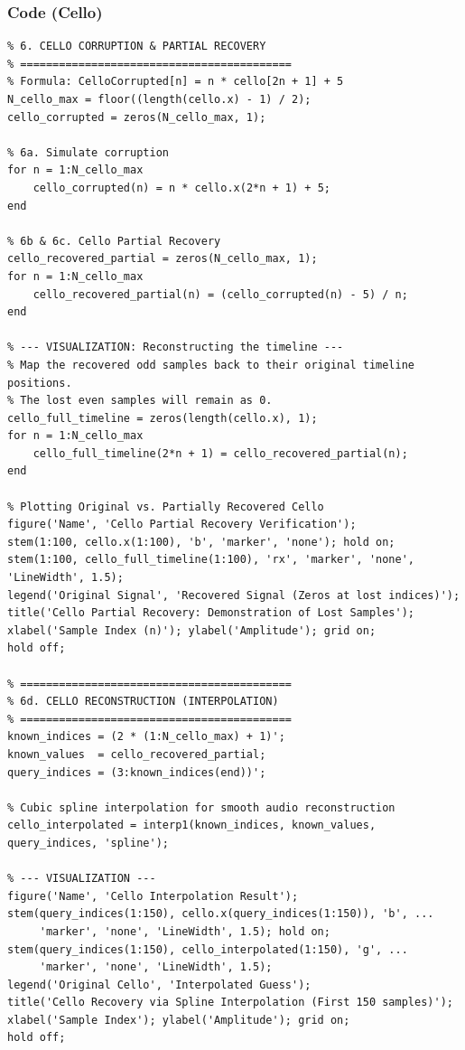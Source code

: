 \documentclass[12pt, a4paper]{article}
\begin{document}
\subsubsection{Code (Cello)}
\begin{lstlisting}[style=matlabstyle]
% ==========================================
% 6. CELLO CORRUPTION & PARTIAL RECOVERY
% ==========================================
% Formula: CelloCorrupted[n] = n * cello[2n + 1] + 5
N_cello_max = floor((length(cello.x) - 1) / 2);
cello_corrupted = zeros(N_cello_max, 1);

% 6a. Simulate corruption
for n = 1:N_cello_max
    cello_corrupted(n) = n * cello.x(2*n + 1) + 5;
end

% 6b & 6c. Cello Partial Recovery
cello_recovered_partial = zeros(N_cello_max, 1);
for n = 1:N_cello_max
    cello_recovered_partial(n) = (cello_corrupted(n) - 5) / n;
end

% --- VISUALIZATION: Reconstructing the timeline ---
% Map the recovered odd samples back to their original timeline positions.
% The lost even samples will remain as 0.
cello_full_timeline = zeros(length(cello.x), 1);
for n = 1:N_cello_max
    cello_full_timeline(2*n + 1) = cello_recovered_partial(n);
end

% Plotting Original vs. Partially Recovered Cello
figure('Name', 'Cello Partial Recovery Verification');
stem(1:100, cello.x(1:100), 'b', 'marker', 'none'); hold on;
stem(1:100, cello_full_timeline(1:100), 'rx', 'marker', 'none', 'LineWidth', 1.5);
legend('Original Signal', 'Recovered Signal (Zeros at lost indices)');
title('Cello Partial Recovery: Demonstration of Lost Samples');
xlabel('Sample Index (n)'); ylabel('Amplitude'); grid on;
hold off;

% ==========================================
% 6d. CELLO RECONSTRUCTION (INTERPOLATION)
% ==========================================
known_indices = (2 * (1:N_cello_max) + 1)';
known_values  = cello_recovered_partial;
query_indices = (3:known_indices(end))';

% Cubic spline interpolation for smooth audio reconstruction
cello_interpolated = interp1(known_indices, known_values, query_indices, 'spline');

% --- VISUALIZATION ---
figure('Name', 'Cello Interpolation Result');
stem(query_indices(1:150), cello.x(query_indices(1:150)), 'b', ...
     'marker', 'none', 'LineWidth', 1.5); hold on;
stem(query_indices(1:150), cello_interpolated(1:150), 'g', ...
     'marker', 'none', 'LineWidth', 1.5);
legend('Original Cello', 'Interpolated Guess');
title('Cello Recovery via Spline Interpolation (First 150 samples)');
xlabel('Sample Index'); ylabel('Amplitude'); grid on;
hold off;
\end{lstlisting}
\end{document}

